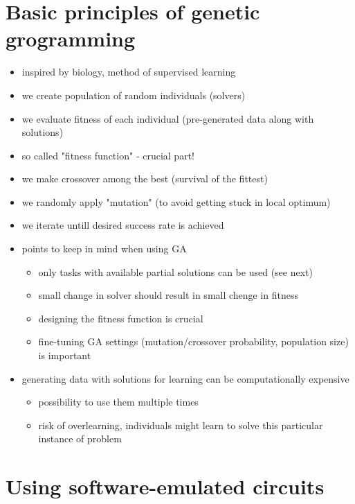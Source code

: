 \documentclass[12pt,oneside]{fithesis2}
\begin{document}
\section{Basic principles of genetic grogramming}
\label{sec:basic-ga}

\begin{itemize}
\item inspired by biology, method of supervised learning
\item we create population of random individuals (solvers)
\item we evaluate fitness of each individual (pre-generated data along with solutions)
\item so called "fitness function" - crucial part!
\item we make crossover among the best (survival of the fittest)
\item we randomly apply "mutation" (to avoid getting stuck in local optimum)
\item we iterate untill desired success rate is achieved
\item points to keep in mind when using GA
\begin{itemize}
\item only tasks with available partial solutions can be used (see next)
\item small change in solver should result in small chenge in fitness
\item designing the fitness function is crucial
\item fine-tuning GA settings (mutation/crossover probability, population size) is important
\end{itemize}
\item generating data with solutions for learning can be computationally expensive
\begin{itemize}
\item possibility to use them multiple times
\item risk of overlearning, individuals might learn to solve this particular instance of problem
\end{itemize}
\end{itemize}

\section{Using software-emulated circuits}
\label{sec:sw-circuits}
\end{document}
